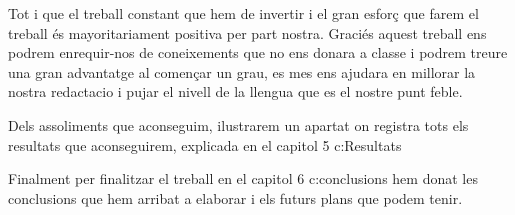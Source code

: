 Tot i que el treball constant que hem de invertir i el gran esforç que farem el treball és mayoritariament positiva per part nostra. Graciés  aquest treball ens podrem enrequir-nos de coneixements que no ens donara a classe i podrem treure una gran advantatge al començar un grau, es mes ens ajudara en millorar la nostra redactacio i pujar el nivell de la llengua que es el nostre punt feble.

Dels assoliments que aconseguim, ilustrarem un apartat on registra tots els resultats que aconseguirem, explicada en el capitol 5 \refname{c:Resultats}

Finalment per finalitzar el treball en el capitol 6 \refname{c:conclusions} hem donat les conclusions que hem arribat a elaborar i els futurs plans que podem tenir.



